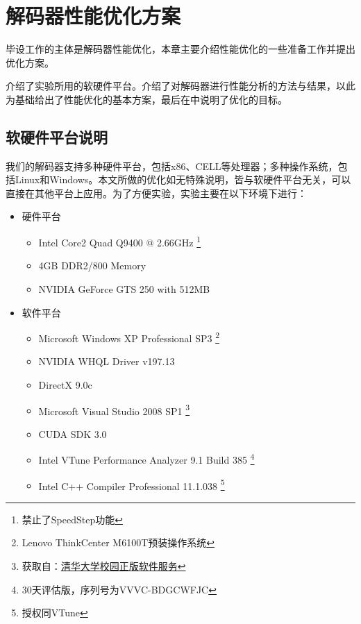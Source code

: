 

\chapter{解码器性能优化方案}
\label{cha:optapproach}

毕设工作的主体是解码器性能优化，本章主要介绍性能优化的一些准备工作并提出优化方案。

介绍了实验所用的软硬件平台。介绍了对解码器进行性能分析的方法与结果，以此为基础给出了性能优化的基本方案，最后在中说明了优化的目标。

\section{软硬件平台说明}
\label{sec:platformdesc}

我们的解码器支持多种硬件平台，包括x86、CELL等处理器；多种操作系统，包括Linux和Windows。本文所做的优化如无特殊说明，皆与软硬件平台无关，可以直接在其他平台上应用。为了方便实验，实验主要在以下环境下进行：

\begin{itemize}
\item {硬件平台}

\begin{itemize}
\item Intel Core2 Quad Q9400 @ 2.66GHz
	\footnote{禁止了SpeedStep功能}
\item 4GB DDR2/800 Memory
\item NVIDIA GeForce GTS 250 with 512MB
\end{itemize}

\item {软件平台}

\begin{itemize}
\item Microsoft Windows XP Professional SP3
	\footnote{Lenovo ThinkCenter M6100T预装操作系统}
\item NVIDIA WHQL Driver v197.13
\item DirectX 9.0c
\item Microsoft Visual Studio 2008 SP1
	\footnote{获取自：\href{http://helpdesk.tsinghua.edu.cn/yhfw/yhfw_zbrj_tz.jsp}{清华大学校园正版软件服务}}
\item CUDA SDK 3.0
\item Intel VTune Performance Analyzer 9.1 Build 385
	\footnote{30天评估版，序列号为VVVC-BDGCWFJC}
\item Intel C++ Compiler Professional 11.1.038
	\footnote{授权同VTune}
\end{itemize}

\end{itemize}


